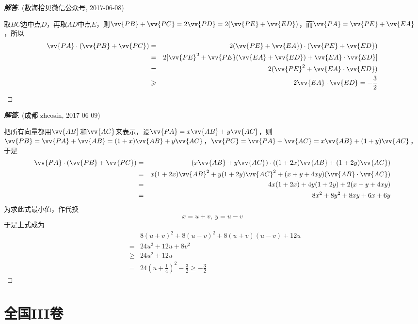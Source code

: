 \documentclass{ctexart}
\begin{document}
\begin{proof}[\textbf{解答}](数海拾贝微信公众号, 2017-06-08)

  取$BC$边中点$D$，再取$AD$中点$E$，则$\vv{PB}+\vv{PC}=2\vv{PD}=2(\vv{PE}+\vv{ED})$，而$\vv{PA}=\vv{PE}+\vv{EA}$，所以
  \begin{eqnarray*}
    \vv{PA} \cdot (\vv{PB}+\vv{PC}) & = & 2(\vv{PE}+\vv{EA}) \cdot (\vv{PE}+\vv{ED}) \\
                                    & = & 2[\vv{PE}^2+\vv{PE}(\vv{EA}+\vv{ED})+\vv{EA} \cdot \vv{ED}] \\
                                    & = & 2(\vv{PE}^2 + \vv{EA} \cdot \vv {ED}) \\
    & \geqslant & 2 \vv{EA} \cdot \vv{ED} =  - \frac{3}{2}
  \end{eqnarray*}
\end{proof}

\begin{proof}[\textbf{解答}](成都-zhcosin, 2017-06-09)

  把所有向量都用$\vv{AB}$和$\vv{AC}$来表示，设$\vv{PA}=x\vv{AB}+y\vv{AC}$，则$\vv{PB}=\vv{PA}+\vv{AB}=(1+x)\vv{AB}+y\vv{AC}$，$\vv{PC}=\vv{PA}+\vv{AC}=x\vv{AB}+(1+y)\vv{AC}$，于是
  \begin{eqnarray*}
    \vv{PA} \cdot (\vv{PB}+\vv{PC}) & = & (x\vv{AB}+y\vv{AC}) \cdot ((1+2x)\vv{AB}+(1+2y)\vv{AC}) \\
                                    & = & x(1+2x)\vv{AB}^2+y(1+2y)\vv{AC}^2+(x+y+4xy)(\vv{AB} \cdot \vv{AC}) \\
                                    & = & 4x(1+2x)+4y(1+2y)+2(x+y+4xy) \\
    & = & 8x^2+8y^2+8xy+6x+6y
  \end{eqnarray*}
  为求此式最小值，作代换
  \[ x=u+v, \  y=u-v \]
  于是上式成为
  \begin{eqnarray*}
    & & 8(u+v)^2+8(u-v)^2+8(u+v)(u-v)+12u \\
    & = & 24u^2+12u+8v^2 \\
    & \geqslant & 24u^2+12u \\
    & = & 24 \left( u+\frac{1}{4} \right)^2-\frac{3}{2} \geqslant -\frac{3}{2}
  \end{eqnarray*}
\end{proof}



\section{全国III卷}
\label{sec:nation-3}
\end{document}
